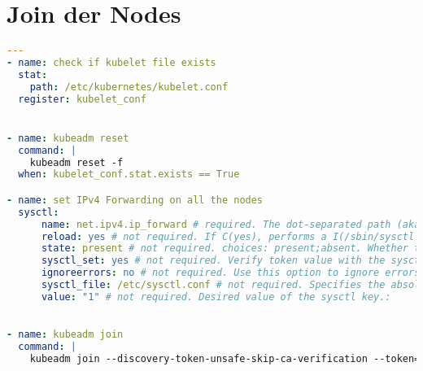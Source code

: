 \section{Join der Nodes}
\hfill \newline
\label{app:join_role}
\begin{lstlisting}[language=yaml]
---
- name: check if kubelet file exists
  stat: 
    path: /etc/kubernetes/kubelet.conf
  register: kubelet_conf


- name: kubeadm reset 
  command: |
    kubeadm reset -f
  when: kubelet_conf.stat.exists == True

- name: set IPv4 Forwarding on all the nodes
  sysctl:
      name: net.ipv4.ip_forward # required. The dot-separated path (aka I(key)) specifying the sysctl variable.
      reload: yes # not required. If C(yes), performs a I(/sbin/sysctl -p) if the C(sysctl_file) is updated. If C(no), does not reload I(sysctl) even if the C(sysctl_file) is updated.
      state: present # not required. choices: present;absent. Whether the entry should be present or absent in the sysctl file.
      sysctl_set: yes # not required. Verify token value with the sysctl command and set with -w if necessary
      ignoreerrors: no # not required. Use this option to ignore errors about unknown keys.
      sysctl_file: /etc/sysctl.conf # not required. Specifies the absolute path to C(sysctl.conf), if not C(/etc/sysctl.conf).
      value: "1" # not required. Desired value of the sysctl key.:
    

- name: kubeadm join
  command: |
    kubeadm join --discovery-token-unsafe-skip-ca-verification --token={{ token }} k8smaster:6443
\end{lstlisting}

